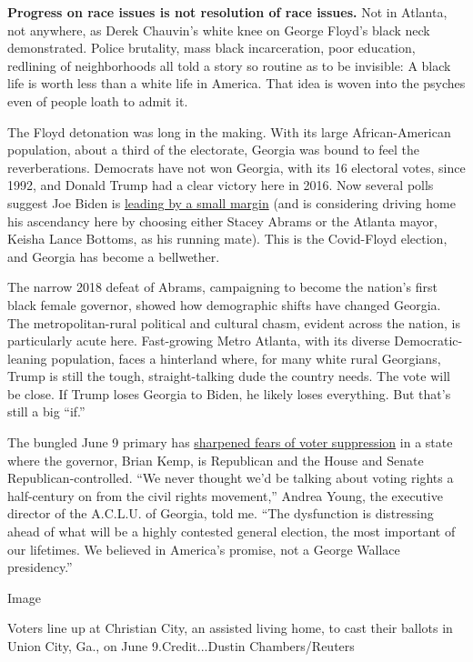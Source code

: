\textbf{Progress on race issues is not resolution of race issues.} Not
in Atlanta, not anywhere, as Derek Chauvin's white knee on George
Floyd's black neck demonstrated. Police brutality, mass black
incarceration, poor education, redlining of neighborhoods all told a
story so routine as to be invisible: A black life is worth less than a
white life in America. That idea is woven into the psyches even of
people loath to admit it.

The Floyd detonation was long in the making. With its large
African-American population, about a third of the electorate, Georgia
was bound to feel the reverberations. Democrats have not won Georgia,
with its 16 electoral votes, since 1992, and Donald Trump had a clear
victory here in 2016. Now several polls suggest Joe Biden is
\href{https://projects.fivethirtyeight.com/polls/president-general/georgia/}{leading
by a small margin} (and is considering driving home his ascendancy here
by choosing either Stacey Abrams or the Atlanta mayor, Keisha Lance
Bottoms, as his running mate). This is the Covid-Floyd election, and
Georgia has become a bellwether.

The narrow 2018 defeat of Abrams, campaigning to become the nation's
first black female governor, showed how demographic shifts have changed
Georgia. The metropolitan-rural political and cultural chasm, evident
across the nation, is particularly acute here. Fast-growing Metro
Atlanta, with its diverse Democratic-leaning population, faces a
hinterland where, for many white rural Georgians, Trump is still the
tough, straight-talking dude the country needs. The vote will be close.
If Trump loses Georgia to Biden, he likely loses everything. But that's
still a big ``if.''

The bungled June 9 primary has
\href{https://www.nytimes.com/2020/06/09/us/politics/atlanta-voting-georgia-primary.html}{sharpened
fears of voter suppression} in a state where the governor, Brian Kemp,
is Republican and the House and Senate Republican-controlled. ``We never
thought we'd be talking about voting rights a half-century on from the
civil rights movement,'' Andrea Young, the executive director of the
A.C.L.U. of Georgia, told me. ``The dysfunction is distressing ahead of
what will be a highly contested general election, the most important of
our lifetimes. We believed in America's promise, not a George Wallace
presidency.''

Image

Voters line up at Christian City, an assisted living home, to cast their
ballots in Union City, Ga., on June 9.Credit...Dustin Chambers/Reuters

